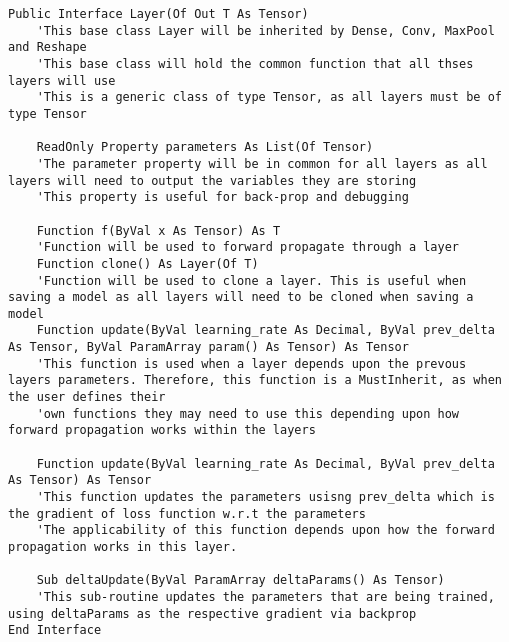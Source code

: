 \begin{verbatim}
Public Interface Layer(Of Out T As Tensor)
    'This base class Layer will be inherited by Dense, Conv, MaxPool and Reshape
    'This base class will hold the common function that all thses layers will use
    'This is a generic class of type Tensor, as all layers must be of type Tensor

    ReadOnly Property parameters As List(Of Tensor)
    'The parameter property will be in common for all layers as all layers will need to output the variables they are storing
    'This property is useful for back-prop and debugging

    Function f(ByVal x As Tensor) As T
    'Function will be used to forward propagate through a layer
    Function clone() As Layer(Of T)
    'Function will be used to clone a layer. This is useful when saving a model as all layers will need to be cloned when saving a model
    Function update(ByVal learning_rate As Decimal, ByVal prev_delta As Tensor, ByVal ParamArray param() As Tensor) As Tensor
    'This function is used when a layer depends upon the prevous layers parameters. Therefore, this function is a MustInherit, as when the user defines their
    'own functions they may need to use this depending upon how forward propagation works within the layers

    Function update(ByVal learning_rate As Decimal, ByVal prev_delta As Tensor) As Tensor
    'This function updates the parameters usisng prev_delta which is the gradient of loss function w.r.t the parameters
    'The applicability of this function depends upon how the forward propagation works in this layer.

    Sub deltaUpdate(ByVal ParamArray deltaParams() As Tensor)
    'This sub-routine updates the parameters that are being trained, using deltaParams as the respective gradient via backprop
End Interface

\end{verbatim}